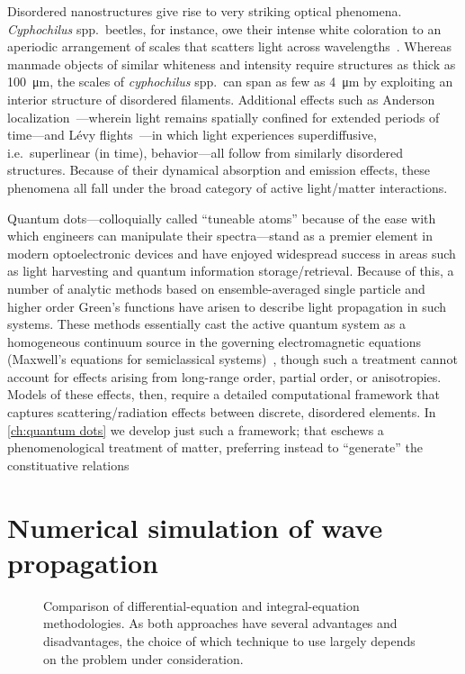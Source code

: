 Disordered nanostructures give rise to very striking optical phenomena.
\emph{Cyphochilus} spp.\ beetles, for instance, owe their intense white coloration to an aperiodic arrangement of scales that scatters light across wavelengths~\cite{Vukusic2007}.
Whereas manmade objects of similar whiteness and intensity require structures as thick as \SI{100}{\micro\meter}, the scales of \emph{cyphochilus} spp.\ can span as few as \SI{4}{\micro\meter} by exploiting an interior structure of disordered filaments.
Additional effects such as Anderson localization~\cite{Anderson1985}---wherein light remains spatially confined for extended periods of time---and L\'evy flights~\cite{Barthelemy2008}---in which light experiences superdiffusive, i.e.\ superlinear (in time), behavior---all follow from similarly disordered structures.
Because of their dynamical absorption and emission effects, these phenomena all fall under the broad category of active light/matter interactions.

Quantum dots---colloquially called ``tuneable atoms'' because of the ease with which engineers can manipulate their spectra---stand as a premier element in modern optoelectronic devices and have enjoyed widespread success in areas such as light harvesting and quantum information storage/retrieval.
Because of this, a number of analytic methods based on ensemble-averaged single particle and higher order Green's functions have arisen to describe light propagation in such systems.
These methods essentially cast the active quantum system as a homogeneous continuum source in the governing electromagnetic equations (Maxwell's equations for semiclassical systems)~\cite{Arecchi1965}, though such a treatment cannot account for effects arising from long-range order, partial order, or anisotropies.
Models of these effects, then, require a detailed computational framework that captures scattering/radiation effects between discrete, disordered elements.
In \cref{ch:quantum dots} we develop just such a framework; that eschews a phenomenological treatment of matter, preferring instead to ``generate'' the constituative relations


\section{Numerical simulation of wave propagation}

\begin{figure}
  \centering
  
  \caption{\label{fig:mindmap} Comparison of differential-equation and integral-equation methodologies.
    As both approaches have several advantages and disadvantages, the choice of which technique to use largely depends on the problem under consideration.
  }
\end{figure}

